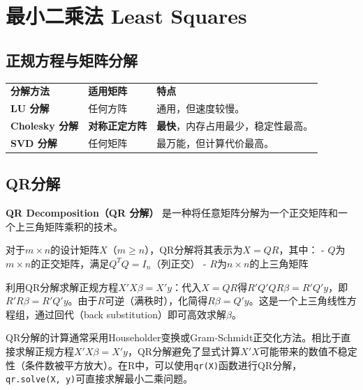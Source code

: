 \documentclass[
]{book}
\begin{document}
\section{最小二乘法 Least Squares}\label{ux6700ux5c0fux4e8cux4e58ux6cd5-least-squares}

\subsection{正规方程与矩阵分解}\label{ux6b63ux89c4ux65b9ux7a0bux4e0eux77e9ux9635ux5206ux89e3}

\begin{longtable}[]{@{}
  >{\raggedright\arraybackslash}p{}
  >{\raggedright\arraybackslash}p{}
  >{\raggedright\arraybackslash}p{}@{}}
\toprule\noalign{}
\endhead
\bottomrule\noalign{}
\endlastfoot
\textbf{分解方法} & \textbf{适用矩阵} & \textbf{特点} \\
\textbf{LU 分解} & 任何方阵 & 通用，但速度较慢。 \\
\textbf{Cholesky 分解} & \textbf{对称正定方阵} & \textbf{最快}，内存占用最少，稳定性最高。 \\
\textbf{SVD 分解} & 任何矩阵 & 最万能，但计算代价最高。 \\
\end{longtable}

\subsection{QR分解}\label{qrux5206ux89e3}

\textbf{QR Decomposition（QR 分解）} 是一种将任意矩阵分解为一个正交矩阵和一个上三角矩阵乘积的技术。

对于\(m \times n\)的设计矩阵\(X\)（\(m \geq n\)），QR分解将其表示为\(X = QR\)，其中：
- \(Q\)为\(m \times n\)的正交矩阵，满足\(Q^T Q = I_n\)（列正交）
- \(R\)为\(n \times n\)的上三角矩阵

利用QR分解求解正规方程\(X'X\beta = X'y\)：代入\(X = QR\)得\(R'Q'QR\beta = R'Q'y\)，即\(R'R\beta = R'Q'y\)。由于\(R\)可逆（满秩时），化简得\(R\beta = Q'y\)。这是一个上三角线性方程组，通过回代（back substitution）即可高效求解\(\beta\)。

QR分解的计算通常采用Householder变换或Gram-Schmidt正交化方法。相比于直接求解正规方程\(X'X\beta = X'y\)，QR分解避免了显式计算\(X'X\)可能带来的数值不稳定性（条件数被平方放大）。在R中，可以使用\texttt{qr(X)}函数进行QR分解，\texttt{qr.solve(X,\ y)}可直接求解最小二乘问题。
\end{document}
